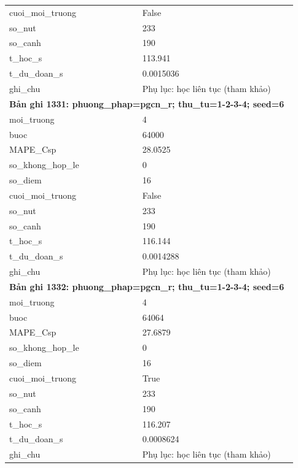 \begin{longtable}{p{0.43\linewidth}p{0.50\linewidth}}
cuoi\_\allowbreak moi\_\allowbreak truong & False \\
so\_\allowbreak nut & 233 \\
so\_\allowbreak canh & 190 \\
t\_\allowbreak hoc\_\allowbreak s & 113.941 \\
t\_\allowbreak du\_\allowbreak doan\_\allowbreak s & 0.0015036 \\
ghi\_\allowbreak chu & Phụ lục: học liên tục (tham khảo) \\
\midrule
\multicolumn{2}{p{0.95\linewidth}}{\textbf{Bản ghi 1331: phuong\_phap=pgcn\_r; thu\_tu=1-2-3-4; seed=6}} \\
moi\_\allowbreak truong & 4 \\
buoc & 64000 \\
MAPE\_\allowbreak Csp & 28.0525 \\
so\_\allowbreak khong\_\allowbreak hop\_\allowbreak le & 0 \\
so\_\allowbreak diem & 16 \\
cuoi\_\allowbreak moi\_\allowbreak truong & False \\
so\_\allowbreak nut & 233 \\
so\_\allowbreak canh & 190 \\
t\_\allowbreak hoc\_\allowbreak s & 116.144 \\
t\_\allowbreak du\_\allowbreak doan\_\allowbreak s & 0.0014288 \\
ghi\_\allowbreak chu & Phụ lục: học liên tục (tham khảo) \\
\midrule
\multicolumn{2}{p{0.95\linewidth}}{\textbf{Bản ghi 1332: phuong\_phap=pgcn\_r; thu\_tu=1-2-3-4; seed=6}} \\
moi\_\allowbreak truong & 4 \\
buoc & 64064 \\
MAPE\_\allowbreak Csp & 27.6879 \\
so\_\allowbreak khong\_\allowbreak hop\_\allowbreak le & 0 \\
so\_\allowbreak diem & 16 \\
cuoi\_\allowbreak moi\_\allowbreak truong & True \\
so\_\allowbreak nut & 233 \\
so\_\allowbreak canh & 190 \\
t\_\allowbreak hoc\_\allowbreak s & 116.207 \\
t\_\allowbreak du\_\allowbreak doan\_\allowbreak s & 0.0008624 \\
ghi\_\allowbreak chu & Phụ lục: học liên tục (tham khảo) \\

\end{longtable}
